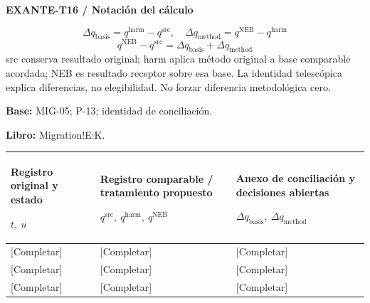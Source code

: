 \textbf{EXANTE-T16 / Notación del cálculo}\par
{\fontsize{9}{11}\selectfont\[ \Delta q_{\mathrm{basis}}=q^{\mathrm{harm}}-q^{\mathrm{src}},\quad \Delta q_{\mathrm{method}}=q^{\mathrm{NEB}}-q^{\mathrm{harm}} \]}
{\fontsize{9}{11}\selectfont\[ q^{\mathrm{NEB}}-q^{\mathrm{src}}=\Delta q_{\mathrm{basis}}+\Delta q_{\mathrm{method}} \]}
src conserva resultado original; harm aplica método original a base comparable acordada; NEB es resultado receptor sobre esa base. La identidad telescópica explica diferencias, no elegibilidad. No forzar diferencia metodológica cero.\par
\textbf{Base:} MIG-05; P-13; identidad de conciliación.\par
\textbf{Libro:} Migration!E:K.\par\endgroup
{\sffamily\fontsize{8.3}{10.3}\selectfont\begin{longtable}{@{}P{54.83mm} P{54.83mm} P{54.83mm}@{}}
\toprule
\textbf{Registro original y estado}\par {\normalfont\fontsize{8.2}{10}\selectfont $t,\ u$} & \textbf{Registro comparable / tratamiento propuesto}\par {\normalfont\fontsize{8.2}{10}\selectfont $q^{\mathrm{src}},\ q^{\mathrm{harm}},\ q^{\mathrm{NEB}}$} & \textbf{Anexo de conciliación y decisiones abiertas}\par {\normalfont\fontsize{8.2}{10}\selectfont $\Delta q_{\mathrm{basis}},\ \Delta q_{\mathrm{method}}$}\\\midrule\endhead
\rule{0pt}{8mm}[Completar] & [Completar] & [Completar]\\\hline
\rule{0pt}{8mm}[Completar] & [Completar] & [Completar]\\\hline
\rule{0pt}{8mm}[Completar] & [Completar] & [Completar]\\\hline
\end{longtable}}
\par\begingroup\sffamily\fontsize{8}{10}\selectfont\color{NEBGreen}\setlength{\parskip}{2pt}\setlength{\abovedisplayskip}{4pt}\setlength{\belowdisplayskip}{4pt}\setlength{\abovedisplayshortskip}{2pt}\setlength{\belowdisplayshortskip}{3pt}

